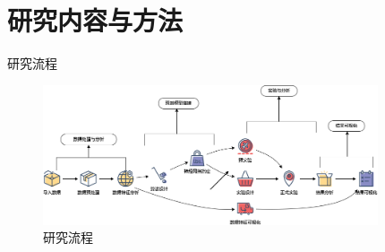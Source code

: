 \documentclass[10pt]{beamer}
\begin{document}
\section{研究内容与方法}

\begin{frame}{研究流程}
    \begin{figure}
        \includegraphics[width=9.9cm]{pic/研究流程图.png}
        \caption{研究流程}
        \label{fig.chart}
    \end{figure}
\end{frame}
\end{document}
